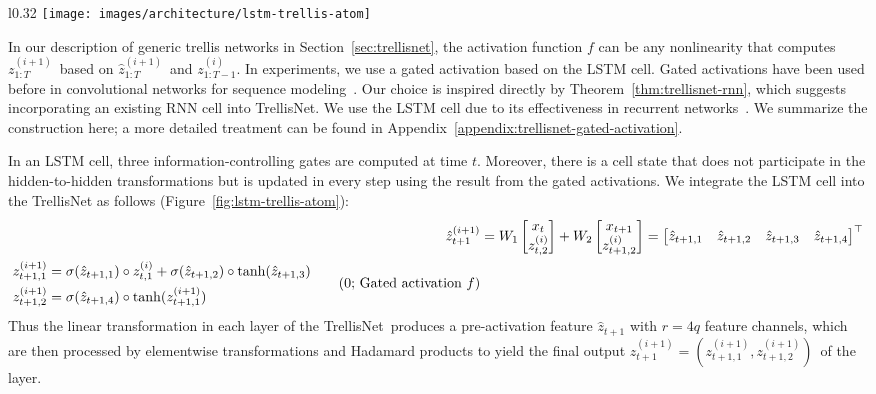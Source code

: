 \documentclass{article} \usepackage{iclr2019_conference,times}
\newcommand{\model}{TrellisNet}
\begin{document}
\begin{wrapfigure}[14]{l}{0.32\textwidth}
\vspace{-3mm}
\centering
    \texttt{[image: images/architecture/lstm-trellis-atom]}
\vspace{-3mm}
    \caption{A gated activation based on the LSTM cell.}
    \label{fig:lstm-trellis-atom}
    \vspace{-3mm}
\end{wrapfigure}
In our description of generic trellis networks in Section~\ref{sec:trellisnet}, the activation function $f$ can be any nonlinearity that computes \small$z_{1:T}^{(i+1)}$\normalsize~based on \small$\hat{z}_{1:T}^{(i+1)}$\normalsize~and \small$z_{1:T-1}^{(i)}$\normalsize. In experiments, we use a gated activation based on the LSTM cell.
Gated activations have been used before in convolutional networks for sequence modeling~\citep{waveNet,dauphinGatedConv}.
Our choice is inspired directly by Theorem~\ref{thm:trellisnet-rnn}, which suggests incorporating an existing RNN cell into TrellisNet. We use the LSTM cell due to its effectiveness in recurrent networks~\citep{jozefowicz2015empirical,greffOdyssey,Melis2018}. We summarize the construction here; a more detailed treatment can be found in Appendix~\ref{appendix:trellisnet-gated-activation}.

In an LSTM cell, three information-controlling gates are computed at time $t$. Moreover, there is a cell state that does not participate in the hidden-to-hidden transformations but is updated in every step using the result from the gated activations. We integrate the LSTM cell into the TrellisNet as follows (Figure~\ref{fig:lstm-trellis-atom}):
\begin{align}
\hat{z}_{t+1}^{(i+1)} &= W_1 \begin{bmatrix}x_t \\ z_{t,2}^{(i)}\end{bmatrix} + W_2 \begin{bmatrix}x_{t+1} \\ z_{t+1,2}^{(i)}\end{bmatrix} = \begin{bmatrix}\hat{z}_{t+1,1} & \hat{z}_{t+1,2} & \hat{z}_{t+1,3} & \hat{z}_{t+1,4} \end{bmatrix}^\top \\
\begin{split}
z_{t+1, 1}^{(i+1)} &= \sigma(\hat{z}_{t+1,1}) \circ z_{t, 1}^{(i)} + \sigma(\hat{z}_{t+1, 2}) \circ \tanh(\hat{z}_{t+1, 3}) \\
z_{t+1, 2}^{(i+1)} &= \sigma(\hat{z}_{t+1,4}) \circ \tanh(z_{t+1, 1}^{(i+1)})
\end{split} \label{eq:lstm-gates} \tag{\number\value{equation}; Gated activation $f$}
\stepcounter{equation}
\end{align}
Thus the linear transformation in each layer of the \model~produces a pre-activation feature $\hat{z}_{t+1}$ with $r=4q$ feature channels, which are then processed by elementwise transformations and Hadamard products to yield the final output \small$z_{t+1}^{(i+1)} = \left(z_{t+1,1}^{(i+1)}, z_{t+1,2}^{(i+1)}\right)$\normalsize~of the layer.
\end{document}
